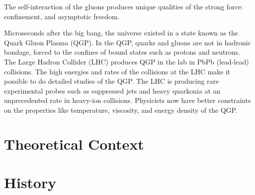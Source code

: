   The self-interaction of the gluons produces unique qualities of the strong 
    force: confinement, and asymptotic freedom. 
  
  Microseconds after the big bang, the universe existed in a state known as
    the Quark Gluon Plasma (QGP).
  In the QGP, quarks and gluons are not in hadronic bondage, forced to 
    the confines of bound states such as protons and neutrons.
  The Large Hadron Collider (LHC) produces QGP in the lab in PbPb (lead-lead)
    collisions.
  The high energies and rates of the collisions at the LHC make it possible 
    to do detailed studies of the QGP. 
  The LHC is producing rare experimental probes such as suppressed jets and 
    heavy quarkonia at an unprecedented rate in heavy-ion collisions. 
  Physicists now have better constraints on the properties like temperature,
    viscosity, and energy density of the QGP. 
  \section{Theoretical Context}
  \section{History }
